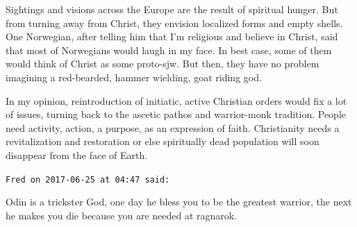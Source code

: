 \begin{footnotesize}
\begin{sffamily}
Sightings and visions across the Europe are the result of spiritual hunger. But from turning away from Christ, they envision localized forms and empty shells. One Norwegian, after telling him that I'm religious and believe in Christ, said that most of Norwegians would laugh in my face. In best case, some of them would think of Christ as some proto-sjw. But then, they have no problem imagining a red-bearded, hammer wielding, goat riding god.

In my opinion, reintroduction of initiatic, active Christian orders would fix a lot of issues, turning back to the ascetic pathos and warrior-monk tradition. People need activity, action, a purpose, as an expression of faith. Christianity needs a revitalization and restoration or else spiritually dead population will soon disappear from the face of Earth.

\hfill

\texttt{Fred on 2017-06-25 at 04:47 said:}

Odin is a trickster God, one day he bless you to be the greatest warrior, the next he makes you die because you are needed at ragnarok.

\end{sffamily}
\end{footnotesize}

